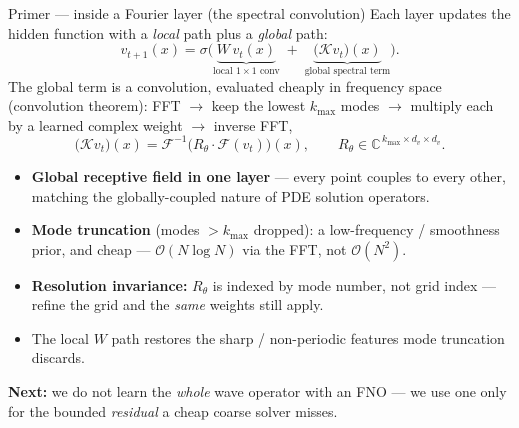 \documentclass[aspectratio=169, 11pt]{beamer}
\newcommand{\fno}{FNO}
\begin{document}
\begin{frame}{Primer --- inside a Fourier layer (the spectral convolution)}
  Each layer updates the hidden function with a \emph{local} path plus a \emph{global} path:
  \[
    v_{t+1}(x)=\sigma\!\Big(\underbrace{W\,v_t(x)}_{\text{local }1\times1\text{ conv}}
      \;+\;\underbrace{\big(\mathcal{K}v_t\big)(x)}_{\text{global spectral term}}\Big).
  \]
  The global term is a convolution, evaluated cheaply in frequency space (convolution
  theorem): FFT $\to$ keep the lowest $k_{\max}$ modes $\to$ multiply each by a learned
  complex weight $\to$ inverse FFT,
  \[
    \big(\mathcal{K}v_t\big)(x)=\mathcal{F}^{-1}\!\big(R_\theta\cdot\mathcal{F}(v_t)\big)(x),
    \qquad R_\theta\in\mathbb{C}^{\,k_{\max}\times d_v\times d_v}.
  \]
  \begin{itemize}\small
    \item \textbf{Global receptive field in one layer} --- every point couples to every
          other, matching the globally-coupled nature of PDE solution operators.
    \item \textbf{Mode truncation} (modes $>k_{\max}$ dropped): a low-frequency / smoothness
          prior, and cheap --- $\mathcal{O}(N\log N)$ via the FFT, not $\mathcal{O}(N^2)$.
    \item \textbf{Resolution invariance:} $R_\theta$ is indexed by mode number, not grid
          index --- refine the grid and the \emph{same} weights still apply.
    \item The local $W$ path restores the sharp / non-periodic features mode truncation discards.
  \end{itemize}
  \medskip
  \footnotesize \textbf{Next:} we do not learn the \emph{whole} wave operator with an
  \fno{} --- we use one only for the bounded \emph{residual} a cheap coarse solver misses.
\end{frame}
\end{document}
